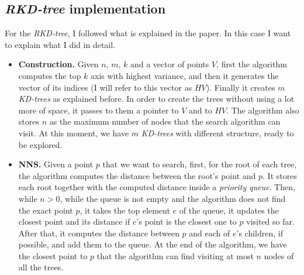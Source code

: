 \subsection{\textit{RKD-tree} implementation}
For the \textit{RKD-tree}, I followed what is explained in the paper. In this case I want to explain what I did in detail.
\begin{itemize}
    \item \textbf{Construction.} Given $n$, $m$, $k$ and a vector of points $V$, first the algorithm computes the top $k$ axis with highest variance, and then it generates the vector of its indices (I will refer to this vector as $HV$). Finally it creates $m$ \textit{KD-trees} as explained before. In order to create the trees without using a lot more of space, it passes to them a pointer to $V$ and to $HV$. The algorithm also stores $n$ as the maximum number of nodes that the search algorithm can visit. At this moment, we have $m$ \textit{KD-trees} with different structure, ready to be explored.
    \item \textbf{NNS.} Given a point $p$ that we want to search, first, for the root of each tree, the algorithm computes the distance between the root's point and $p$. It stores each root together with the computed distance inside a \textit{priority queue}. Then, while $n > 0$, while the queue is not empty and the algorithm does not find the exact point $p$, it takes the top element $e$ of the queue, it updates the closest point and its distance if $e$'s point is the closest one to $p$ visited so far. After that, it computes the distance between $p$ and each of $e$'s children, if possible, and add them to the queue. At the end of the algorithm, we have the closest point to $p$ that the algorithm can find visiting at most $n$ nodes of all the trees.
\end{itemize}